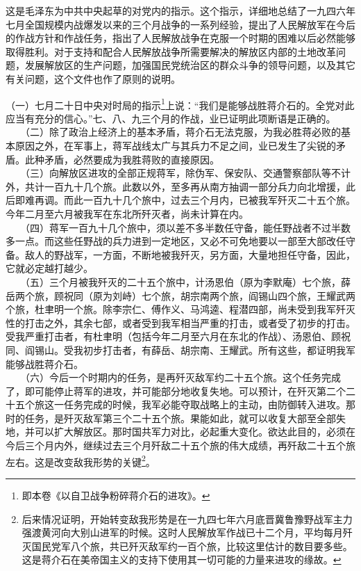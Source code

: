 \documentclass[cn,11pt,chinese]{elegantbook}
\begin{document}
\begin{introduction}\item  这是毛泽东为中共中央起草的对党内的指示。这个指示，详细地总结了一九四六年七月全国规模内战爆发以来的三个月战争的一系列经验，提出了人民解放军在今后的作战方针和作战任务，指出了人民解放战争在克服一个时期的困难以后必然能够取得胜利。对于支持和配合人民解放战争所需要解决的解放区内部的土地改革问题，发展解放区的生产问题，加强国民党统治区的群众斗争的领导问题，以及其它有关问题，这个文件也作了原则的说明。\end{introduction}
（一）七月二十日中央对时局的指示\footnote[1]{ 即本卷《以自卫战争粉碎蒋介石的进攻》。}上说：“我们是能够战胜蒋介石的。全党对此应当有充分的信心。”七、八、九三个月的作战，业已证明此项断语是正确的。\\
　　（二）除了政治上经济上的基本矛盾，蒋介石无法克服，为我必胜蒋必败的基本原因之外，在军事上，蒋军战线太广与其兵力不足之间，业已发生了尖锐的矛盾。此种矛盾，必然要成为我胜蒋败的直接原因。\\
　　（三）向解放区进攻的全部正规蒋军，除伪军、保安队、交通警察部队等不计外，共计一百九十几个旅。此数以外，至多再从南方抽调一部分兵力向北增援，此后即难再调。而此一百九十几个旅中，过去三个月内，已被我军歼灭二十五个旅。今年二月至六月被我军在东北所歼灭者，尚未计算在内。\\
　　（四）蒋军一百九十几个旅中，须以差不多半数任守备，能任野战者不过半数多一点。而这些任野战的兵力进到一定地区，又必不可免地要以一部至大部改任守备。敌人的野战军，一方面，不断地被我歼灭，另方面，大量地担任守备，因此，它就必定越打越少。\\
　　（五）三个月被我歼灭的二十五个旅中，计汤恩伯（原为李默庵）七个旅，薛岳两个旅，顾祝同（原为刘峙）七个旅，胡宗南两个旅，阎锡山四个旅，王耀武两个旅，杜聿明一个旅。除李宗仁、傅作义、马鸿逵、程潜四部，尚未受到我军歼灭性的打击之外，其余七部，或者受到我军相当严重的打击，或者受了初步的打击。受我严重打击者，有杜聿明（包括今年二月至六月在东北的作战）、汤恩伯、顾祝同、阎锡山。受我初步打击者，有薛岳、胡宗南、王耀武。所有这些，都证明我军能够战胜蒋介石。\\
　　（六）今后一个时期内的任务，是再歼灭敌军约二十五个旅。这个任务完成了，即可能停止蒋军的进攻，并可能部分地收复失地。可以预计，在歼灭第二个二十五个旅这一任务完成的时候，我军必能夺取战略上的主动，由防御转入进攻。那时的任务，是歼灭敌军第三个二十五个旅。果能如此，就可以收复大部至全部失地，并可以扩大解放区。那时国共军力对比，必起重大变化。欲达此目的，必须在今后三个月内外，继续过去三个月歼敌二十五个旅的伟大成绩，再歼敌二十五个旅左右。这是改变敌我形势的关键\footnote[2]{ 后来情况证明，开始转变敌我形势是在一九四七年六月底晋冀鲁豫野战军主力强渡黄河向大别山进军的时候。这时人民解放军作战已十二个月，平均每月歼灭国民党军八个旅，共已歼灭敌军约一百个旅，比较这里估计的数目要多些。这是蒋介石在美帝国主义的支持下使用其一切可能的力量来进攻的缘故。}。\\
\end{document}
